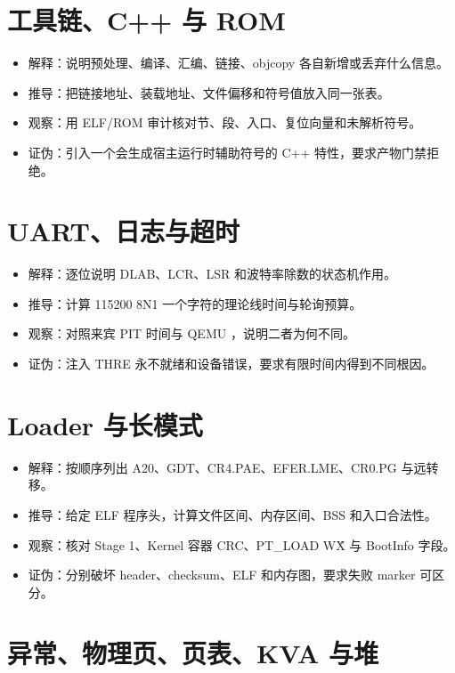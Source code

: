 \section*{工具链、C++ 与 ROM}

\begin{itemize}
  \item 解释：说明预处理、编译、汇编、链接、objcopy 各自新增或丢弃什么信息。
  \item 推导：把链接地址、装载地址、文件偏移和符号值放入同一张表。
  \item 观察：用 ELF/ROM 审计核对节、段、入口、复位向量和未解析符号。
  \item 证伪：引入一个会生成宿主运行时辅助符号的 C++ 特性，要求产物门禁拒绝。
\end{itemize}

\section*{UART、日志与超时}

\begin{itemize}
  \item 解释：逐位说明 DLAB、LCR、LSR 和波特率除数的状态机作用。
  \item 推导：计算 115200 8N1 一个字符的理论线时间与轮询预算。
  \item 观察：对照来宾 PIT 时间与 QEMU ，说明二者为何不同。
  \item 证伪：注入 THRE 永不就绪和设备错误，要求有限时间内得到不同根因。
\end{itemize}

\section*{Loader 与长模式}

\begin{itemize}
  \item 解释：按顺序列出 A20、GDT、CR4.PAE、EFER.LME、CR0.PG 与远转移。
  \item 推导：给定 ELF 程序头，计算文件区间、内存区间、BSS 和入口合法性。
  \item 观察：核对 Stage 1、Kernel 容器 CRC、PT\_LOAD W\^X 与 BootInfo 字段。
  \item 证伪：分别破坏 header、checksum、ELF 和内存图，要求失败 marker 可区分。
\end{itemize}

\section*{异常、物理页、页表、KVA 与堆}

